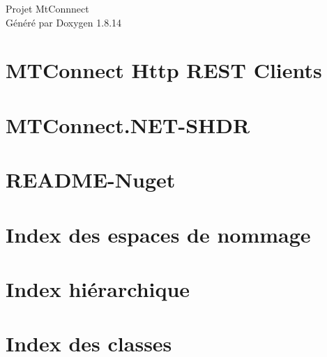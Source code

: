 \documentclass[twoside]{book}
\newcommand{\+}{\discretionary{\mbox{\scriptsize$\hookleftarrow$}}{}{}}
\newcommand{\clearemptydoublepage}{%
  \newpage{\pagestyle{empty}\cleardoublepage}%
}
\begin{document}
\hypersetup{pageanchor=false,
             bookmarksnumbered=true,
             pdfencoding=unicode
            }
\begin{titlepage}
\vspace*{7cm}
\begin{center}%
{\Large Projet Mt\+Connnect }\\
\vspace*{1cm}
{\large Généré par Doxygen 1.8.14}\\
\end{center}
\end{titlepage}
\clearemptydoublepage
{}
\tableofcontents
\clearemptydoublepage
{}
\hypersetup{pageanchor=true}

\chapter{M\+T\+Connect Http R\+E\+ST Clients}
\label{md_packages__m_t_connect_8_n_e_t-_h_t_t_p_85_84_81__r_e_a_d_m_e}

\chapter{M\+T\+Connect.\+N\+ET-\/\+S\+H\+DR}
\label{md_packages__m_t_connect_8_n_e_t-_s_h_d_r_85_84_81__r_e_a_d_m_e}

\chapter{R\+E\+A\+D\+M\+E-\/\+Nuget}
\label{md_packages__m_t_connect_8_n_e_t_85_84_81__r_e_a_d_m_e-_nuget}

\chapter{Index des espaces de nommage}

\chapter{Index hiérarchique}

\chapter{Index des classes}

\end{document}
